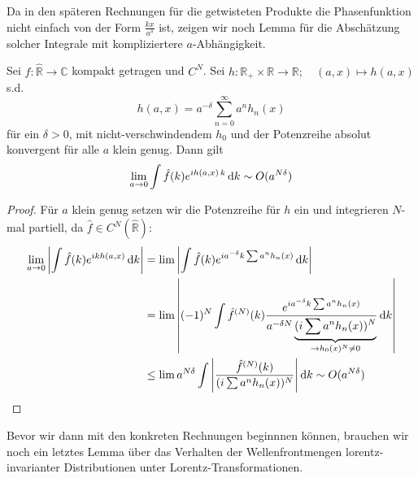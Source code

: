 Da in den späteren Rechnungen für die getwisteten Produkte die Phasenfunktion nicht einfach von der Form \(\frac{k x}{a^{\delta}}\) ist, zeigen wir noch Lemma für die Abschätzung solcher Integrale mit kompliziertere $a$-Abhängigkeit.

\begin{lemma}
\label{lemm:f_a_komplizierte_phase}
Sei \(\hat f:\hat{\mathbb{R}} \to \mathbb{C}\) kompakt getragen und \(C^N\).
Sei \(h: \mathbb{R}_+ \times \mathbb{R} \to \mathbb{R}; \quad (a,x) \mapsto h(a,x)\) s.d.
\begin{equation*}
    h(a,x) = a^{-\delta} \sum_{n=0}^\infty a^n h_n(x)
\end{equation*}
für ein \(\delta > 0\), mit nicht-verschwindendem \(h_0\) und der Potenzreihe absolut konvergent für alle \(a\) klein genug. Dann gilt
\begin{equation*}
    \lim_{a \to 0} \int \hat f(k) e^{i h(a,x)\,k} \mathop{}\!\mathrm{d} k
    \sim O(a^{N \delta})
\end{equation*}
\end{lemma}

\begin{proof}
Für \(a\) klein genug setzen wir die Potenzreihe für \(h\) ein und integrieren \(N\)-mal partiell, da \( \hat f \in C^N(\hat{\mathbb{R}})\):
\begin{align*}
    \lim_{a \to 0}
    \left\lvert \int \hat f(k) e^{ikh(a,x)} \mathop{}\!\mathrm{d} k \right\rvert
    &=
    \lim
    \left\lvert
        \int  \hat f(k) e^{ia^{-\delta}k\sum a^n h_n(x)} \mathop{}\!\mathrm{d} k
    \right\rvert
    \\ &=
    \lim
    \left\lvert
        (-1)^N \int \hat f^{(N)}(k) \frac{e^{ia^{-\delta}k\sum a^n h_n(x)}}
        {a^{-\delta N}\underbrace{(i \sum a^n h_n(x))^N}_{\to h_0(x)^N \neq 0}}
        \mathop{}\!\mathrm{d} k
    \right\rvert
    \\ &\leq \lim
    a^{N \delta} \int \left\lvert \frac{\hat f^{(N)}(k)}{(i \sum a^n h_n(x))^N} \right\rvert \mathop{}\!\mathrm{d} k
    \sim O (a^{N \delta})
\end{align*}
\end{proof}

\begin{remark}

\end{remark}

Bevor wir dann mit den konkreten Rechnungen beginnnen können, brauchen wir noch ein letztes Lemma über das Verhalten der Wellenfrontmengen lorentz-invarianter Distributionen unter Lorentz-Transformationen.

